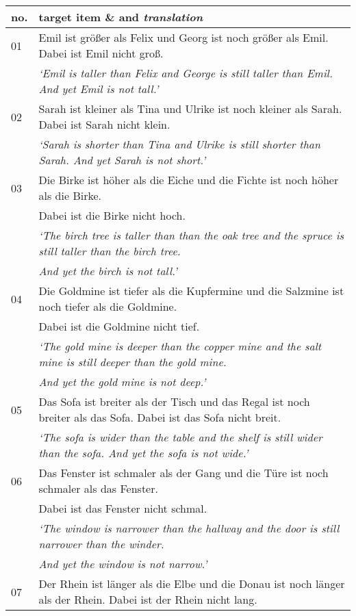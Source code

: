 \documentclass[output=paper,
modfonts
]{langscibook}
\begin{document}
\begin{table}[H]\tiny
\begin{tabular}{l|l}
\lsptoprule
no. & target item \& and \textit{translation} \\
\midrule \midrule 
01 & Emil ist größer als Felix und Georg ist noch größer als Emil. Dabei ist Emil nicht groß. \\
   & \textit{`Emil is taller than Felix and George is still taller than Emil. And yet Emil is not tall.'}\\
\midrule
02 & Sarah ist kleiner als Tina und Ulrike ist noch kleiner als Sarah. Dabei ist Sarah nicht klein.\\
   & \textit{`Sarah is shorter than Tina and Ulrike is still shorter than Sarah. And yet Sarah is not short.'}\\
\midrule 
03 & Die Birke ist höher als die Eiche und die Fichte ist noch höher als die Birke. \\
   & Dabei ist die Birke nicht hoch.\\
   & \textit{`The birch tree is taller than than the oak tree and the spruce is still taller than the birch tree.}\\
   & \textit{And yet the birch is not tall.'}\\
\midrule
04 & Die Goldmine ist tiefer als die Kupfermine und die Salzmine ist noch tiefer als die Goldmine. \\
   & Dabei ist die Goldmine nicht tief. \\
   & \textit{`The gold mine is deeper than the copper mine and the salt mine is still deeper than the gold mine.} \\
   & \textit{And yet the gold mine is not deep.'}\\
\midrule
05 & Das Sofa ist breiter als der Tisch und das Regal ist noch breiter als das Sofa. Dabei ist das Sofa nicht breit.\\
   & \textit{`The sofa is wider than the table and the shelf is still wider than the sofa. And yet the sofa is not wide.'}\\
\midrule
06 & Das Fenster ist schmaler als der Gang und die Türe ist noch schmaler als das Fenster.\\
   & Dabei ist das Fenster nicht schmal.\\
   & \textit{`The window is narrower than the hallway and the door is still narrower than the winder.} \\
   & \textit{And yet the window is not narrow.'}\\
\midrule
07 & Der Rhein ist länger als die Elbe und die Donau ist noch länger als der Rhein. Dabei ist der Rhein nicht lang.\\

\end{tabular}
\end{table}
\end{document}
